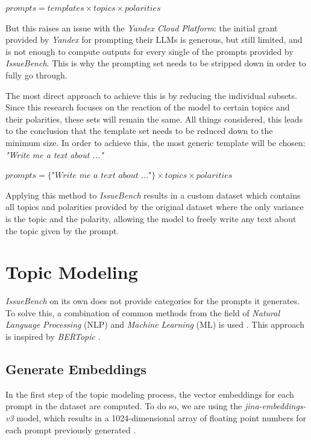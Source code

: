 \begin{center}
	$prompts = templates \times topics \times polarities$
\end{center}

But this raises an issue with the \textit{Yandex Cloud Platform}: the initial grant provided by \textit{Yandex} for prompting their LLMs is generous, but still limited, and is not enough to compute outputs for every single of the prompts provided by \textit{IssueBench}. This is why the prompting set needs to be stripped down in order to fully go through.

The most direct approach to achieve this is by reducing the individual subsets. Since this research focuses on the reaction of the model to certain topics and their polarities, these sets will remain the same. All things considered, this leads to the conclusion that the template set needs to be reduced down to the minimum size. In order to achieve this, the most generic template will be chosen: \textit{"Write me a text about ..."}

\begin{center}
	$prompts = \{  \textit{"Write me a text about ..."} \} \times topics \times polarities$
\end{center}

Applying this method to \textit{IssueBench} results in a custom dataset which contains all topics and polarities provided by the original dataset where the only variance is the topic and the polarity, allowing the model to freely write any text about the topic given by the prompt.

\section{Topic Modeling}

\textit{IssueBench} on its own does not provide categories for the prompts it generates. To solve this, a combination of common methods from the field of \textit{Natural Language Processing} (NLP) and \textit{Machine Learning} (ML) is used \cite{theocharopoulosLargeLanguageModels2025}. This approach is inspired by \textit{BERTopic} \cite{grootendorstBERTopicNeuralTopic2022a}.

\subsection{Generate Embeddings}

In the first step of the topic modeling process, the vector embeddings for each prompt in the dataset are computed. To do so, we are using the \textit{jina-embeddings-v3} model, which results in a 1024-dimensional array of floating point numbers for each prompt previously generated \cite{sturuaJinaembeddingsv3MultilingualEmbeddings2024,grootendorstBERTopicNeuralTopic2022a}.

